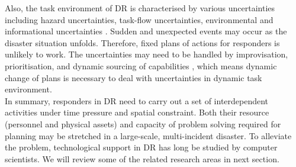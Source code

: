Also, the task environment of DR is characterised by various uncertainties including hazard uncertainties, task-flow uncertainties, environmental and informational uncertainties \cite{Chen2008}. Sudden and unexpected events may occur as the disaster situation unfolds. Therefore, fixed plans of actions for responders is unlikely to work. The uncertainties may need to be handled by improvisation, prioritisation, and dynamic sourcing of capabilities \cite{Faraj2006}, which means dynamic change of plans is necessary to deal with uncertainties in dynamic task environment.\\   

In summary, responders in DR need to carry out a set of interdependent activities under time pressure and spatial constraint. Both their resource (personnel and physical assets) and capacity of problem solving required for planning may be stretched in a large-scale, multi-incident disaster. To alleviate the problem, technological support in DR has long be studied by computer scientists. We will review some of the related research areas in next section.\\






